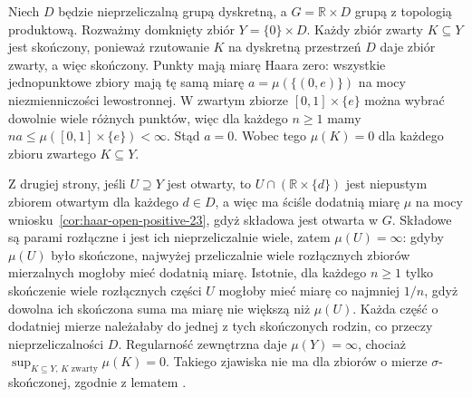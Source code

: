 \begin{przyklad}
\label{ex:haar-non-sigma-compact-23}
Niech $D$ będzie nieprzeliczalną grupą dyskretną,
a $G=\mathbb R\times D$ grupą z topologią produktową.
Rozważmy domknięty zbiór $Y=\{0\}\times D$.
Każdy zbiór zwarty $K\subseteq Y$ jest skończony, ponieważ
rzutowanie $K$ na dyskretną przestrzeń $D$ daje zbiór
zwarty, a więc skończony. Punkty mają miarę Haara zero: wszystkie jednopunktowe
zbiory mają tę samą miarę $a=\mu(\{(0,e)\})$
na mocy niezmienniczości lewostronnej.
W zwartym zbiorze $[0,1]\times\{e\}$ można wybrać
dowolnie wiele różnych punktów, więc dla każdego
$n\ge1$ mamy $na\le\mu([0,1]\times\{e\})<\infty$.
Stąd $a=0$.
Wobec tego $\mu(K)=0$ dla każdego zbioru zwartego $K\subseteq Y$.

Z drugiej strony, jeśli $U\supseteq Y$ jest otwarty,
to $U\cap(\mathbb R\times\{d\})$ jest niepustym
zbiorem otwartym dla każdego $d\in D$, a więc ma
ściśle dodatnią miarę $\mu$ na mocy wniosku~\ref{cor:haar-open-positive-23}, gdyż składowa jest otwarta w $G$.
Składowe są parami rozłączne i jest ich nieprzeliczalnie
wiele, zatem $\mu(U)=\infty$: gdyby $\mu(U)$ było
skończone, najwyżej przeliczalnie wiele rozłącznych
zbiorów mierzalnych mogłoby mieć dodatnią miarę.
Istotnie, dla każdego $n\ge1$ tylko skończenie wiele
rozłącznych części $U$ mogłoby mieć miarę co najmniej
$1/n$, gdyż dowolna ich skończona suma ma miarę
nie większą niż $\mu(U)$. Każda część o dodatniej
mierze należałaby do jednej z tych skończonych rodzin,
co przeczy nieprzeliczalności $D$.
Regularność zewnętrzna daje $\mu(Y)=\infty$, chociaż
$\sup_{K\subseteq Y,\,K\text{ zwarty}}\mu(K)=0$.
Takiego zjawiska nie ma dla zbiorów o mierze
$\sigma$-skończonej, zgodnie z lematem
.
\end{przyklad}

